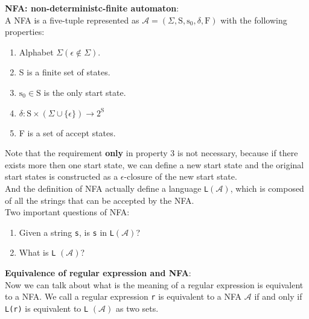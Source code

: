 \documentclass{article}
\begin{document}
\textbf{NFA\@: non-deterministc-finite automaton}:
\\

A NFA is a five-tuple represented as \( \mathcal{A} = (\Sigma, \text{S}, \text{s}_0, \delta, \text{F}) \) with the following properties:

\begin{enumerate}
    \item Alphabet \( \Sigma (\epsilon \notin \Sigma) \).
    \item S is a finite set of states.
    \item \( \text{s}_0 \in \text{S} \) is the only start state.
    \item \( \delta : \text{S} \times (\Sigma \cup \{ \epsilon \}) \to 2^{\text{S}} \)
    \item F is a set of accept states.
\end{enumerate}

Note that the requirement \textbf{only} in property 3 is not necessary, because if there exists more
then one start state, we can define a new start state and the original start states is constructed as
a \( \epsilon\text{-closure} \) of the new start state.
\\

And the definition of NFA actually define a language \texttt{L}\( (\mathcal{A}) \), which is composed of all the strings
that can be accepted by the NFA\@.
\\

Two important questions of NFA\@:
\begin{enumerate}
    \item Given a string \texttt{s}, is \texttt{s} in \texttt{L}\( (\mathcal{A}) \)?
    \item What is \texttt{L} \( (\mathcal{A}) \)?
\end{enumerate}

\textbf{Equivalence of regular expression and NFA}:
\\

Now we can talk about what is the meaning of a regular expression is equivalent to a NFA\@.
We call a regular expression \texttt{r} is equivalent to a NFA \( \mathcal{A} \) if and only if
\texttt{L{(r)}} is equivalent to \texttt{L} \( (\mathcal{A}) \) as two sets.


\pagebreak
\end{document}
